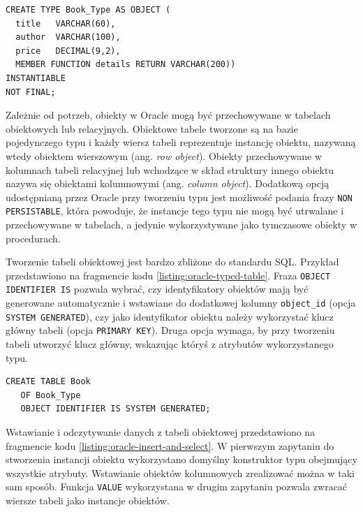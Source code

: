 \documentclass[a4paper,twoside,12pt]{book}
\begin{document}
\begin{lstlisting}[style=SQL, caption={Tworzenie typu w Oracle Database.}, label={listing:oracle-create-type}, captionpos=b]
CREATE TYPE Book_Type AS OBJECT (
  title   VARCHAR(60),                  
  author  VARCHAR(100),             
  price   DECIMAL(9,2),    
  MEMBER FUNCTION details RETURN VARCHAR(200))
INSTANTIABLE
NOT FINAL;
\end{lstlisting}

Zależnie od potrzeb, obiekty w Oracle mogą być przechowywane w tabelach obiektowych lub relacyjnych. Obiektowe tabele tworzone są na bazie pojedynczego typu i każdy wiersz tabeli reprezentuje instancję obiektu, nazywaną wtedy obiektem wierszowym (ang. \textit{row object}). Obiekty przechowywane w kolumnach tabeli relacyjnej lub wchodzące w skład struktury innego obiektu nazywa się obiektami kolumnowymi (ang. \textit{column object}). Dodatkową opcją udostępnianą przez Oracle przy tworzeniu typu jest możliwość podania frazy \lstinline{NON PERSISTABLE}, która powoduje, że instancje tego typu nie mogą być utrwalane i przechowywane w tabelach, a jedynie wykorzystywane jako tymczasowe obiekty w procedurach.

Tworzenie tabeli obiektowej jest bardzo zbliżone do standardu SQL. Przykład przedstawiono na fragmencie kodu \ref{listing:oracle-typed-table}. Fraza \lstinline{OBJECT IDENTIFIER IS} pozwala wybrać, czy identyfikatory obiektów mają być generowane automatycznie i wstawiane do dodatkowej kolumny \lstinline{object_id} (opcja \lstinline{SYSTEM GENERATED}), czy jako identyfikator obiektu należy wykorzystać klucz główny tabeli (opcja \lstinline{PRIMARY KEY}). Druga opcja wymaga, by przy tworzeniu tabeli utworzyć klucz główny, wskazując któryś z atrybutów wykorzystanego typu. 

\begin{lstlisting}[style=SQL, caption={Tworzenie tabeli obiektowej w Oracle Database.}, label={listing:oracle-typed-table}, captionpos=b]
CREATE TABLE Book
   OF Book_Type
   OBJECT IDENTIFIER IS SYSTEM GENERATED;
\end{lstlisting}

Wstawianie i odczytywanie danych z tabeli obiektowej przedstawiono na fragmencie kodu \ref{listing:oracle-insert-and-select}. W pierwszym zapytaniu do stworzenia instancji obiektu wykorzystano domyślny konstruktor typu obejmujący wszystkie atrybuty. Wstawianie obiektów kolumnowych zrealizować można w taki sam sposób. Funkcja \lstinline{VALUE} wykorzystana w drugim zapytaniu pozwala zwracać wiersze tabeli jako instancje obiektów.
\end{document}

